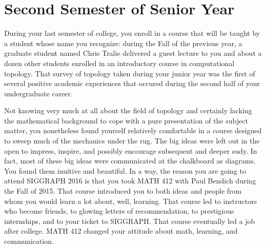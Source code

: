 \documentclass[../main.tex]{subfiles}
\begin{document}
\section{Second Semester of Senior Year}
 
During your last semester of college, you enroll in a course that will be taught by a student whose name you recognize: during the Fall of the previous year, a graduate student named Chris Tralie delivered a guest lecture to you and about a dozen other students enrolled in an introductory course in computational topology. That survey of topology taken during your junior year was the first of several positive academic experiences that occured during the second half of your undergraduate career.

Not knowing very much at all about the field of topology and certainly lacking the mathematical background to cope with a pure presentation of the subject matter, you nonetheless found yourself relatively comfortable in a course designed to sweep much of the mechanics under the rug. The big ideas were left out in the open to impress, inspire, and possibly encourage subsequent and deeper sudy. In fact, most of these big ideas were communicated at the chalkboard as diagrams. You found them inuitive and beautiful. In a way, the reason you are going to attend SIGGRAPH 2016 is that you took MATH 412 with Paul Bendich during the Fall of 2015. That course introduced you to both ideas and people from whom you would learn a lot about, well, learning. That course led to instructors who become friends, to glowing letters of recommendation, to prestigious internships, and to your ticket to SIGGRAPH. That course eventually led a job after college. MATH 412 changed your attitude about math, learning, and communication.
\end{document}
